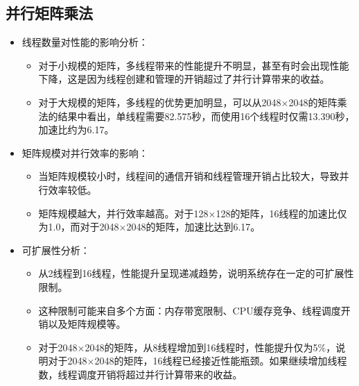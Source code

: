 \documentclass{SYSUReport}
\begin{document}
\subsection{并行矩阵乘法}
\begin{itemize}
    \item 线程数量对性能的影响分析：
    \begin{itemize}
        \item 对于小规模的矩阵，多线程带来的性能提升不明显，甚至有时会出现性能下降，这是因为线程创建和管理的开销超过了并行计算带来的收益。
        \item 对于大规模的矩阵，多线程的优势更加明显，可以从2048×2048的矩阵乘法的结果中看出，单线程需要82.575秒，而使用16个线程时仅需13.390秒，加速比约为6.17。
    \end{itemize}
    
    \item 矩阵规模对并行效率的影响：
    \begin{itemize}
        \item 当矩阵规模较小时，线程间的通信开销和线程管理开销占比较大，导致并行效率较低。
        \item 矩阵规模越大，并行效率越高。对于128×128的矩阵，16线程的加速比仅为1.0，而对于2048×2048的矩阵，加速比达到6.17。
    \end{itemize}
    
    \item 可扩展性分析：
    \begin{itemize}
        \item 从2线程到16线程，性能提升呈现递减趋势，说明系统存在一定的可扩展性限制。
        \item 这种限制可能来自多个方面：内存带宽限制、CPU缓存竞争、线程调度开销以及矩阵规模等。
        \item 对于2048×2048的矩阵，从8线程增加到16线程时，性能提升仅为5\%，说明对于2048×2048的矩阵，16线程已经接近性能瓶颈。如果继续增加线程数，线程调度开销将超过并行计算带来的收益。
    \end{itemize}
\end{itemize}
\end{document}
